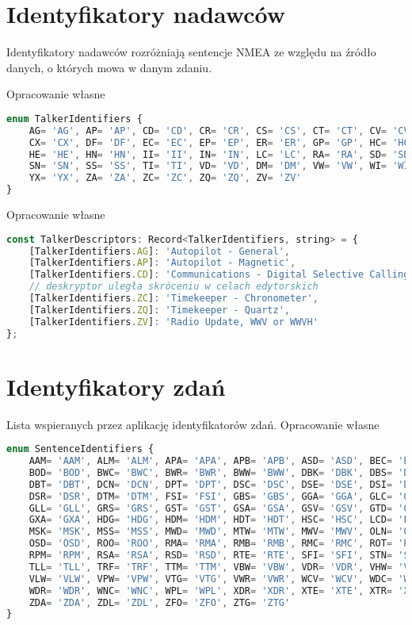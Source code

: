 \documentclass[skorowidz,skroty]{dyplomWEZUT}
\begin{document}
\section{Identyfikatory nadawców}\label{sec:talker ids}
Identyfikatory nadawców rozróżniają sentencje NMEA ze względu na źródło danych, o których mowa w danym zdaniu.

{Opracowanie własne}{\label{code:Talkers enum}}
\begin{lstlisting}[language=JavaScript]
enum TalkerIdentifiers {
    AG= 'AG', AP= 'AP', CD= 'CD', CR= 'CR', CS= 'CS', CT= 'CT', CV= 'CV',
    CX= 'CX', DF= 'DF', EC= 'EC', EP= 'EP', ER= 'ER', GP= 'GP', HC= 'HC',
    HE= 'HE', HN= 'HN', II= 'II', IN= 'IN', LC= 'LC', RA= 'RA', SD= 'SD',
    SN= 'SN', SS= 'SS', TI= 'TI', VD= 'VD', DM= 'DM', VW= 'VW', WI= 'WI',
    YX= 'YX', ZA= 'ZA', ZC= 'ZC', ZQ= 'ZQ', ZV= 'ZV'
}
\end{lstlisting}

{Opracowanie własne}{\label{code: talkers descriptors}}
\begin{lstlisting}[language=JavaScript]
const TalkerDescriptors: Record<TalkerIdentifiers, string> = {
    [TalkerIdentifiers.AG]: 'Autopilot - General',
    [TalkerIdentifiers.AP]: 'Autopilot - Magnetic',
    [TalkerIdentifiers.CD]: 'Communications - Digital Selective Calling (DSC)',
    // deskryptor uległa skróceniu w celach edytorskich
    [TalkerIdentifiers.ZC]: 'Timekeeper - Chronometer',
    [TalkerIdentifiers.ZQ]: 'Timekeeper - Quartz',
    [TalkerIdentifiers.ZV]: 'Radio Update, WWV or WWVH'
};
\end{lstlisting}

\section{Identyfikatory zdań}\label{sec:sentence ids}
Lista wspieranych przez aplikację identyfikatorów zdań.
{Opracowanie własne}{\label{code:Sentences enum}}
\begin{lstlisting}[language=JavaScript]
enum SentenceIdentifiers {
    AAM= 'AAM', ALM= 'ALM', APA= 'APA', APB= 'APB', ASD= 'ASD', BEC= 'BEC',
    BOD= 'BOD', BWC= 'BWC', BWR= 'BWR', BWW= 'BWW', DBK= 'DBK', DBS= 'DBS',
    DBT= 'DBT', DCN= 'DCN', DPT= 'DPT', DSC= 'DSC', DSE= 'DSE', DSI= 'DSI',
    DSR= 'DSR', DTM= 'DTM', FSI= 'FSI', GBS= 'GBS', GGA= 'GGA', GLC= 'GLC',
    GLL= 'GLL', GRS= 'GRS', GST= 'GST', GSA= 'GSA', GSV= 'GSV', GTD= 'GTD',
    GXA= 'GXA', HDG= 'HDG', HDM= 'HDM', HDT= 'HDT', HSC= 'HSC', LCD= 'LCD',
    MSK= 'MSK', MSS= 'MSS', MWD= 'MWD', MTW= 'MTW', MWV= 'MWV', OLN= 'OLN',
    OSD= 'OSD', ROO= 'ROO', RMA= 'RMA', RMB= 'RMB', RMC= 'RMC', ROT= 'ROT',
    RPM= 'RPM', RSA= 'RSA', RSD= 'RSD', RTE= 'RTE', SFI= 'SFI', STN= 'STN',
    TLL= 'TLL', TRF= 'TRF', TTM= 'TTM', VBW= 'VBW', VDR= 'VDR', VHW= 'VHW',
    VLW= 'VLW', VPW= 'VPW', VTG= 'VTG', VWR= 'VWR', WCV= 'WCV', WDC= 'WDC',
    WDR= 'WDR', WNC= 'WNC', WPL= 'WPL', XDR= 'XDR', XTE= 'XTE', XTR= 'XTR',
    ZDA= 'ZDA', ZDL= 'ZDL', ZFO= 'ZFO', ZTG= 'ZTG'
}
\end{lstlisting}
\end{document}
